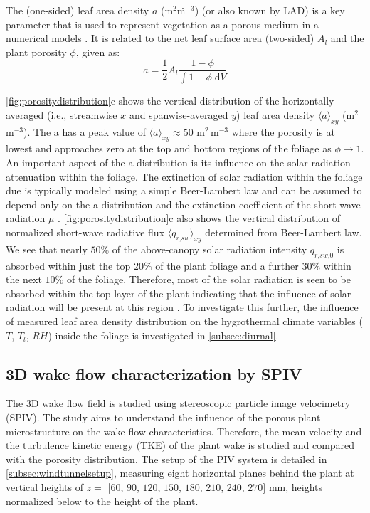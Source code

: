 The (one-sided) leaf area density $a$ (m$^2$\.m$^{-3}$) (or also known by LAD) is a key parameter that is used to represent vegetation as a porous medium in a numerical models \citep{DeLangre2008,Gross1987,Manickathan2018a}. It is related to the net leaf surface area (two-sided) $A_l$ and the plant porosity $\phi$, given as:
\begin{equation}
a = \frac{1}{2}{A_l}\frac{{1 - \phi }}{{\int {1 - \phi \;{\mathrm{d}}V} }}
\end{equation}

\cref{fig:porositydistribution}c shows the vertical distribution of the horizontally-averaged (i.e., streamwise $x$ and spanwise-averaged $y$) leaf area density $\langle a \rangle_{\textit{xy}}$ (m$^2$\,m$^{-3}$). The a has a peak value of $\langle a \rangle_{\textit{xy}}\approx50$ m$^2$\,m$^{-3}$ where the porosity is at lowest and approaches zero at the top and bottom regions of the foliage as $\phi\rightarrow1$. An important aspect of the a distribution is its influence on the solar radiation attenuation within the foliage. The extinction of solar radiation within the foliage due is typically modeled using a simple Beer-Lambert law and can be assumed to depend only on the a distribution and the extinction coefficient of the short-wave radiation $\mu$ \citep{Manickathan2018a}. \cref{fig:porositydistribution}c also shows the vertical distribution of normalized short-wave radiative flux $\langle q_{\textit{r,sw}} \rangle_{\textit{xy}}$ determined from Beer-Lambert law. We see that nearly $50\%$ of the above-canopy solar radiation intensity $q_{\textit{r,sw,0}}$ is absorbed within just the top $20\%$ of the plant foliage and a further $30\%$ within the next $10\%$ of the foliage. Therefore, most of the solar radiation is seen to be absorbed within the top layer of the plant indicating that the influence of solar radiation will be present at this region \citep{Manickathan2018a}. To investigate this further, the influence of measured leaf area density distribution on the hygrothermal climate variables ($T$, $T_l$, $\textit{RH}$) inside the foliage is investigated in \cref{subsec:diurnal}.


\subsection{3D wake flow characterization by SPIV}
\label{subsec:stereopiv}

The 3D wake flow field is studied using stereoscopic particle image velocimetry (SPIV). The study aims to understand the influence of the porous plant microstructure on the wake flow characteristics. Therefore, the mean velocity and the turbulence kinetic energy (TKE) of the plant wake is studied and compared with the porosity distribution. The setup of the PIV system is detailed in \cref{subsec:windtunnelsetup}, measuring eight horizontal planes behind the plant at vertical heights of $z =$ $[60$, $90$, $120$, $150$, $180$, $210$, $240$, $270]$ mm, heights normalized below to the height of the plant.

